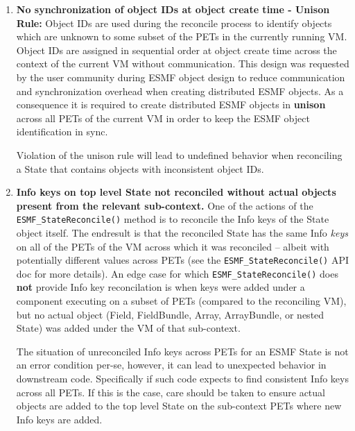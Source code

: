 %

\begin{enumerate}

\item{\bf No synchronization of object IDs at object create time - Unison Rule:}
Object IDs are used during the reconcile process to identify objects
which are unknown to some subset of the PETs in the currently running VM.
Object IDs are assigned in sequential order at object create time across the
context of the current VM without communication. This design was requested by
the user community during ESMF object design to reduce communication and
synchronization overhead when creating distributed ESMF objects.
As a consequence it is required to create distributed ESMF objects in
{\bf unison} across all PETs of the current VM in order to keep the ESMF object
identification in sync.

Violation of the unison rule will lead to undefined behavior when reconciling
a State that contains objects with inconsistent object IDs.

\item{\bf Info keys on top level State not reconciled without actual objects
present from the relevant sub-context.} One of the actions of the
{\tt ESMF\_StateReconcile()} method is to reconcile the Info keys of the
State object itself. The endresult is that the reconciled State has the
same Info {\em keys} on all of the PETs of the VM across which it was
reconciled -- albeit with potentially different values across PETs
(see the {\tt ESMF\_StateReconcile()} API doc for more details). An edge case
for which {\tt ESMF\_StateReconcile()} does {\bf not} provide Info key
reconcilation is when keys were added under a component executing on a subset
of PETs (compared to the reconciling VM), but no actual object
(Field, FieldBundle, Array, ArrayBundle, or nested State) was added under the
VM of that sub-context.

The situation of unreconciled Info keys across PETs for an ESMF State is not an
error condition per-se, however, it can lead to unexpected behavior in
downstream code. Specifically if such code expects to find consistent Info keys
across all PETs. If this is the case, care should be taken to ensure actual
objects are added to the top level State on the sub-context PETs where new Info
keys are added.

\end{enumerate}



